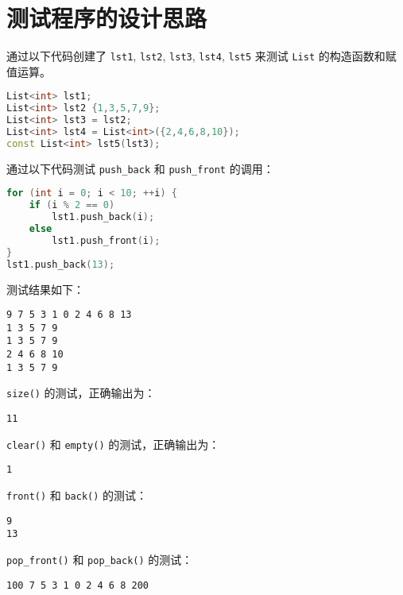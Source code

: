\documentclass[UTF8]{ctexart}
\begin{document}
  
  
\pagestyle{fancy}  
\fancyhead{}  
  
\section{测试程序的设计思路}  
  
通过以下代码创建了 \texttt{lst1}, \texttt{lst2}, \texttt{lst3}, \texttt{lst4}, \texttt{lst5} 来测试 \texttt{List} 的构造函数和赋值运算。  
  
\begin{lstlisting}[language=C++]  
List<int> lst1;  
List<int> lst2 {1,3,5,7,9};  
List<int> lst3 = lst2;  
List<int> lst4 = List<int>({2,4,6,8,10});  
const List<int> lst5(lst3);  
\end{lstlisting}  
  
通过以下代码测试 \texttt{push\_back} 和 \texttt{push\_front} 的调用：  
  
\begin{lstlisting}[language=C++]  
for (int i = 0; i < 10; ++i) {  
    if (i % 2 == 0)   
        lst1.push_back(i);  
    else   
        lst1.push_front(i);  
}  
lst1.push_back(13);  
\end{lstlisting}  
  
测试结果如下：  
  
\begin{verbatim}  
9 7 5 3 1 0 2 4 6 8 13  
1 3 5 7 9  
1 3 5 7 9  
2 4 6 8 10  
1 3 5 7 9  
\end{verbatim}  
  
\texttt{size()} 的测试，正确输出为：  
  
\begin{verbatim}  
11  
\end{verbatim}  
  
\texttt{clear()} 和 \texttt{empty()} 的测试，正确输出为：  
  
\begin{verbatim}  
1  
\end{verbatim}  
  
\texttt{front()} 和 \texttt{back()} 的测试：  
  
\begin{verbatim}  
9  
13  
\end{verbatim}  
  
\texttt{pop\_front()} 和 \texttt{pop\_back()} 的测试：  
  
\begin{verbatim}  
100 7 5 3 1 0 2 4 6 8 200  
\end{verbatim}  
  
\end{document}
